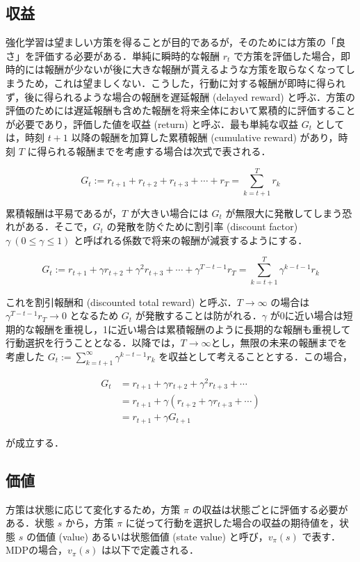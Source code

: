 \documentclass[titlepage]{ltjsbook}
\begin{document}
\subsection{収益}
強化学習は望ましい方策を得ることが目的であるが，そのためには方策の「良さ」を評価する必要がある．単純に瞬時的な報酬 $r_t$ で方策を評価した場合，即時的には報酬が少ないが後に大きな報酬が貰えるような方策を取らなくなってしまうため，これは望ましくない．こうした，行動に対する報酬が即時に得られず，後に得られるような場合の報酬を遅延報酬 (delayed reward) と呼ぶ．方策の評価のためには遅延報酬も含めた報酬を将来全体において累積的に評価することが必要であり，評価した値を収益 (return) と呼ぶ．最も単純な収益 $G_t$ としては，時刻 $t+1$ 以降の報酬を加算した累積報酬 (cumulative reward) があり，時刻 $T$ に得られる報酬までを考慮する場合は次式で表される．

\begin{equation}
G_t := r_{t+1}+r_{t+2}+r_{t+3}+\cdots+r_T = \sum_{k=t+1}^{T}r_{k}
\end{equation}

累積報酬は平易であるが，$T$ が大きい場合には $G_t$ が無限大に発散してしまう恐れがある．そこで，$G_t$ の発散を防ぐために割引率 (discount factor) $\gamma\ (0\leq \gamma \leq 1)$ と呼ばれる係数で将来の報酬が減衰するようにする．

\begin{equation}
G_t := r_{t+1}+\gamma r_{t+2}+\gamma^2 r_{t+3}+\cdots+\gamma^{T-t-1}r_T = \sum_{k=t+1}^{T}\gamma^{k-t-1} r_{k}
\end{equation}

これを割引報酬和 (discounted total reward) と呼ぶ．$T\to \infty$ の場合は $\gamma^{T-t-1}r_T \to 0$ となるため $G_t$ が発散することは防がれる．$\gamma$ が0に近い場合は短期的な報酬を重視し，1に近い場合は累積報酬のように長期的な報酬も重視して行動選択を行うこととなる．以降では，$T\to \infty$とし，無限の未来の報酬までを考慮した $G_t:=\sum_{k=t+1}^{\infty}\gamma^{k-t-1} r_{k}$ を収益として考えることとする．この場合，

\begin{align}
G_t &= r_{t+1}+\gamma r_{t+2}+\gamma^2 r_{t+3}+\cdots\\
&=r_{t+1}+\gamma (r_{t+2}+\gamma r_{t+3}+\cdots)\\
&=r_{t+1} + \gamma G_{t+1}
\end{align} 

が成立する．

\subsection{価値}
方策は状態に応じて変化するため，方策 $\pi$ の収益は状態ごとに評価する必要がある．状態 $s$ から，方策 $\pi$ に従って行動を選択した場合の収益の期待値を，状態 $s$ の価値 (value) あるいは状態価値 (state value) と呼び，$v_\pi(s)$ で表す．MDPの場合，$v_\pi(s)$ は以下で定義される．
\end{document}
